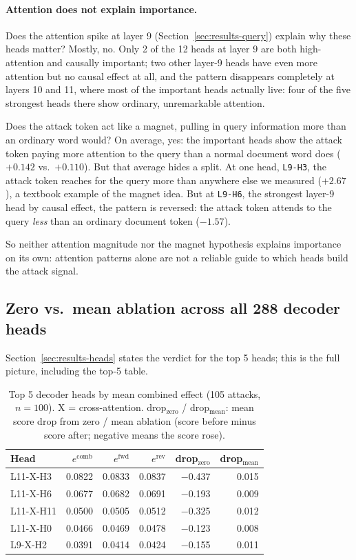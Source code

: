 \documentclass[11pt]{article}
\newcommand{\fwd}{\ensuremath{e^{\mathrm{fwd}}}}
\newcommand{\rev}{\ensuremath{e^{\mathrm{rev}}}}
\newcommand{\comb}{\ensuremath{e^{\mathrm{comb}}}}
\begin{document}
\paragraph{Attention does not explain importance.} Does the attention
spike at layer 9 (Section~\ref{sec:results-query}) explain why these
heads matter? Mostly, no. Only 2 of the 12 heads at layer 9 are both
high-attention and causally important; two other layer-9 heads have even
more attention but no causal effect at all, and the pattern disappears
completely at layers 10 and 11, where most of the important heads
actually live: four of the five strongest heads there show ordinary,
unremarkable attention.

Does the attack token act like a magnet, pulling in query information
more than an ordinary word would? On average, yes: the important heads
show the attack token paying more attention to the query than a normal
document word does ($+0.142$ vs.\ $+0.110$). But that average hides a
split. At one head, \texttt{L9-H3}, the attack token reaches for the
query more than anywhere else we measured ($+2.67$), a textbook example
of the magnet idea. But at \texttt{L9-H6}, the strongest layer-9 head by
causal effect, the pattern is reversed: the attack token attends to the
query \emph{less} than an ordinary document token ($-1.57$).

So neither attention magnitude nor the magnet hypothesis explains
importance on its own: attention patterns alone are not a reliable guide
to which heads build the attack signal.

\subsection{Zero vs.\ mean ablation across all 288 decoder heads}
\label{sec:appendix-zeroablation}

Section~\ref{sec:results-heads} states the verdict for the top 5 heads;
this is the full picture, including the top-5 table.

\begin{table}[H]
\centering
\caption{Top 5 decoder heads by mean combined effect (105 attacks, $n=100$).
X = cross-attention. drop$_{\text{zero}}$ / drop$_{\text{mean}}$: mean score
drop from zero / mean ablation (score before minus score after; negative
means the score rose).}
\label{tab:tophead}
\small
\begin{tabular}{lrrrrr}
\toprule
Head & $\comb$ & $\fwd$ & $\rev$ & drop$_{\text{zero}}$ & drop$_{\text{mean}}$ \\
\midrule
L11-X-H3  & 0.0822 & 0.0833 & 0.0837 & $-$0.437 & 0.015 \\
L11-X-H6  & 0.0677 & 0.0682 & 0.0691 & $-$0.193 & 0.009 \\
L11-X-H11 & 0.0500 & 0.0505 & 0.0512 & $-$0.325 & 0.012 \\
L11-X-H0  & 0.0466 & 0.0469 & 0.0478 & $-$0.123 & 0.008 \\
L9-X-H2   & 0.0391 & 0.0414 & 0.0424 & $-$0.155 & 0.011 \\
\bottomrule
\end{tabular}
\end{table}
\end{document}
